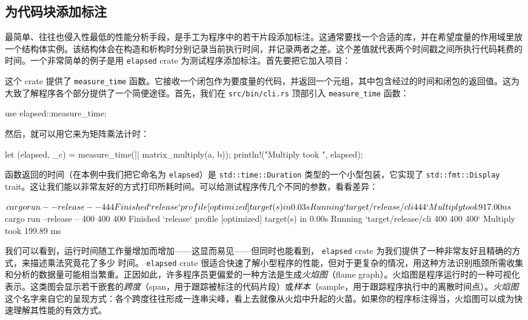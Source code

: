 \subsection{为代码块添加标注}
\label{idx:idx_3d7ade6e}
最简单、往往也侵入性最低的性能分析手段，是手工为程序中的若干片段添加标注。这通常要找一个合适的库，并在希望度量的作用域里放一个结构体实例。该结构体会在构造和析构时分别记录当前执行时间，并记录两者之差。这个差值就代表两个时间戳之间所执行代码耗费的时间。一个非常简单的例子是用 \texttt{elapsed} crate 为测试程序添加标注。首先要把它加入项目：
这个 crate 提供了 \texttt{measure\_\allowbreak{}time} 函数。它接收一个闭包作为要度量的代码，并返回一个元组，其中包含经过的时间和闭包的返回值。这为大致了解程序各个部分提供了一个简便途径。首先，我们在 \texttt{src/\allowbreak{}bin/\allowbreak{}cli.\allowbreak{}rs} 顶部引入 \texttt{measure\_\allowbreak{}time} 函数：
\begin{codebox}[rust]
use elapsed::measure_time;
\end{codebox}
然后，就可以用它来为矩阵乘法计时：
\begin{codebox}[rust]
let (elapsed, _c) = measure_time(|| matrix_multiply(a, b));
    println!("Multiply took {}", elapsed);
\end{codebox}
函数返回的时间（在本例中我们把它命名为 \texttt{elapsed}）是 \texttt{std::\allowbreak{}time::\allowbreak{}Duration} 类型的一个小型包装，它实现了 \texttt{std::\allowbreak{}fmt::\allowbreak{}Display} trait。这让我们能以非常友好的方式打印所耗时间。可以给测试程序传几个不同的参数，看看差异：
\begin{codeboxdark}
$ cargo run --release -- 4 4 4
     Finished `release` profile [optimized] target(s) in 0.03s
      Running `target/release/cli 4 4 4`
 Multiply took 917.00 ns
 $ cargo run --release -- 400 400 400
     Finished `release` profile [optimized] target(s) in 0.00s
      Running `target/release/cli 400 400 400`
 Multiply took 199.89 ms
\end{codeboxdark}
我们可以看到，运行时间随工作量增加而增加——这显而易见——但同时也能看到，
\texttt{elapsed} crate 为我们提供了一种非常友好且精确的方式，来描述乘法究竟花了多少
时间。
\label{idx:idx_da15dddb}
\texttt{elapsed} crate 很适合快速了解小型程序的性能，但对于更复杂的情况，用这种方法识别瓶颈所需收集和分析的数据量可能相当繁重。正因如此，许多程序员更偏爱的一种方法是生成\emph{火焰图}（flame graph）。火焰图是程序运行时的一种可视化表示。这类图会显示若干嵌套的\emph{跨度}（span，用于跟踪被标注的代码片段）或\emph{样本}（sample，用于跟踪程序执行中的离散时间点）。\emph{火焰图}这个名字来自它的呈现方式：各个跨度往往形成一连串尖峰，看上去就像从火焰中升起的火苗。如果你的程序标注得当，火焰图可以成为快速理解其性能的有效方式。
